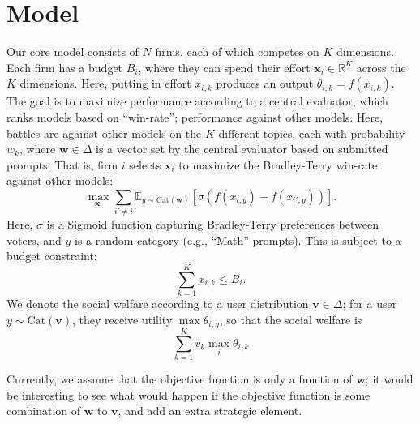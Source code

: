 \documentclass[msom,blindrev]{informs3_ExtAbst}
\begin{document}
\maketitle

\section{Model}
Our core model consists of $N$ firms, each of which competes on $K$ dimensions.
Each firm has a budget $B_{i}$, where they can spend their effort $\mathbf{x}_{i} \in \mathbb{R}^{K}$ across the $K$ dimensions.
Here, putting in effort $x_{i,k}$ produces an output $\theta_{i,k} = f(x_{i,k}).$
The goal is to maximize performance according to a central evaluator, which ranks models based on ``win-rate''; performance against other models.
Here, battles are against other models on the $K$ different topics, each with probability $w_{k}$, where $\mathbf{w} \in \Delta$ is a vector set by the central evaluator based on submitted prompts. 
That is, firm $i$ selects $\mathbf{x}_{i}$ to maximize the Bradley-Terry win-rate against other models: 
\[
\max_{\mathbf{x}_{i}} \sum_{i' \neq i} \mathbb{E}_{y \sim \mathrm{Cat}(\mathbf{w})}[\sigma(f(x_{i,y}) - f(x_{i',y}))].
\]
Here, $\sigma$ is a Sigmoid function capturing Bradley-Terry preferences between voters, and $y$ is a random category (e.g., ``Math'' prompts). 
This is subject to a budget constraint: 
\[
\sum_{k=1}^{K} x_{i,k} \leq B_{i}.
\]
We denote the social welfare according to a user distribution $\mathbf{v} \in \Delta$; for a user $y \sim \mathrm{Cat}(\mathbf{v})$, they receive utility $\max \theta_{i,y}$, so that the social welfare is 
\[
\sum_{k=1}^{K} v_{k} \max\limits_{i}  \theta_{i,k}
\]

\begin{todoblock}
    Currently, we assume that the objective function is only a function of $\mathbf{w}$; it would be interesting to see what would happen if the objective function is some combination of $\mathbf{w}$ to $\mathbf{v}$, and add an extra strategic element.  
\end{todoblock}
\end{document}
